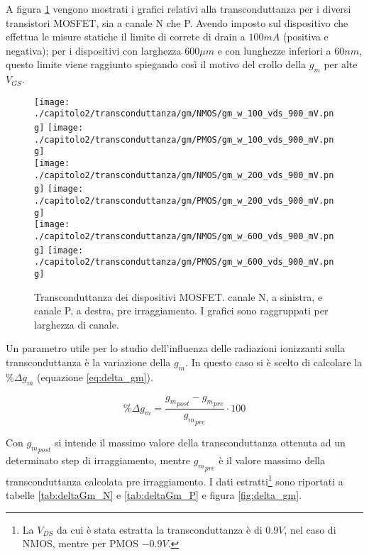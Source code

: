 \vspace{0.5cm}

A figura \ref{fig:gm_w} vengono mostrati i grafici relativi alla transconduttanza per i diversi transistori MOSFET, sia a canale N che P. Avendo imposto sul dispositivo che effettua le misure statiche il limite di correte di drain a $100mA$ (positiva e negativa); per i dispositivi con larghezza $600\mu m$ e con lunghezze inferiori a $60nm$, questo limite viene raggiunto spiegando così il motivo del crollo della $g_m$ per alte $V_{GS}$.

\begin{figure}[t]
    \centering
    \texttt{[image: ./capitolo2/transconduttanza/gm/NMOS/gm\_w\_100\_vds\_900\_mV.png]}
    \texttt{[image: ./capitolo2/transconduttanza/gm/PMOS/gm\_w\_100\_vds\_900\_mV.png]}\\
    \vspace{0.2cm}
    \texttt{[image: ./capitolo2/transconduttanza/gm/NMOS/gm\_w\_200\_vds\_900\_mV.png]}
    \texttt{[image: ./capitolo2/transconduttanza/gm/PMOS/gm\_w\_200\_vds\_900\_mV.png]}\\
    \vspace{0.2cm}
    \texttt{[image: ./capitolo2/transconduttanza/gm/NMOS/gm\_w\_600\_vds\_900\_mV.png]}
    \texttt{[image: ./capitolo2/transconduttanza/gm/PMOS/gm\_w\_600\_vds\_900\_mV.png]}

    \caption[Dati $g_m$ estratti pre-irraggiamento]{Transconduttanza dei dispositivi MOSFET. canale N, a sinistra, e canale P, a destra, pre irraggiamento. I grafici sono raggruppati per larghezza di canale.}
    \label{fig:gm_w}

\end{figure}


\vspace{0.5cm}


Un parametro utile per lo studio dell'influenza delle radiazioni ionizzanti sulla transconduttanza è  la variazione della $g_m$. In questo caso si è scelto di calcolare la $ \% \Delta g_m $ (equazione \ref{eq:delta_gm}). 

\begin{equation}
    {\%} \Delta {g_m}  = \frac{{g_m}_{post} - {g_m}_{pre}}{{g_m}_{pre}}\cdot 100
    \label{eq:delta_gm}
\end{equation}

Con ${g_m}_{post}$ si intende il massimo valore della transconduttanza ottenuta ad un determinato step di irraggiamento, mentre ${g_m}_{pre}$ è il valore massimo della transconduttanza calcolata pre irraggiamento. I dati estratti\footnote{La $V_{DS}$ da cui è stata estratta la transconduttanza è di $0.9V$, nel caso di NMOS, mentre per PMOS $-0.9V$.} sono riportati a tabelle \ref{tab:deltaGm_N} e \ref{tab:deltaGm_P} e figura \ref{fig:delta_gm}.

